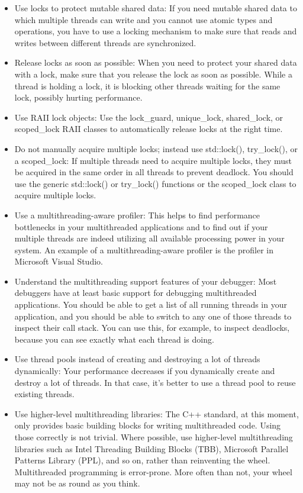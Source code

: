 \begin{itemize}
\item
Use locks to protect mutable shared data: If you need mutable shared data to which multiple threads can write and you cannot use atomic types and operations, you have to use a locking mechanism to make sure that reads and writes between different threads are synchronized.

\item
Release locks as soon as possible: When you need to protect your shared data with a lock, make sure that you release the lock as soon as possible. While a thread is holding a lock, it is blocking other threads waiting for the same lock, possibly hurting performance.

\item
Use RAII lock objects: Use the lock\_guard, unique\_lock, shared\_lock, or scoped\_lock RAII classes to automatically release locks at the right time.

\item
Do not manually acquire multiple locks; instead use std::lock(), try\_lock(), or a scoped\_lock: If multiple threads need to acquire multiple locks, they must be acquired in the same order in all threads to prevent deadlock. You should use the generic std::lock() or try\_lock() functions or the scoped\_lock class to acquire multiple locks.

\item
Use a multithreading-aware profiler: This helps to find performance bottlenecks in your multithreaded applications and to find out if your multiple threads are indeed utilizing all available processing power in your system. An example of a multithreading-aware profiler is the profiler in Microsoft Visual Studio.

\item
Understand the multithreading support features of your debugger: Most debuggers have at least basic support for debugging multithreaded applications. You should be able to get a list of all running threads in your application, and you should be able to switch to any one of those threads to inspect their call stack. You can use this, for example, to inspect deadlocks, because you can see exactly what each thread is doing.

\item
Use thread pools instead of creating and destroying a lot of threads dynamically: Your performance decreases if you dynamically create and destroy a lot of threads. In that case, it’s better to use a thread pool to reuse existing threads.

\item
Use higher-level multithreading libraries: The C++ standard, at this moment, only provides basic building blocks for writing multithreaded code. Using those correctly is not trivial. Where possible, use higher-level multithreading libraries such as Intel Threading Building Blocks (TBB), Microsoft Parallel Patterns Library (PPL), and so on, rather than reinventing the wheel. Multithreaded programming is error-prone. More often than not, your wheel may not be as round as you think.
\end{itemize}
